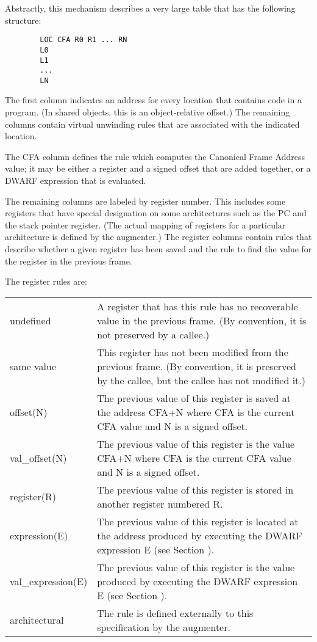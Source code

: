 Abstractly, this mechanism describes a very large table that
has the following structure:

\begin{verbatim}
        LOC CFA R0 R1 ... RN
        L0
        L1
        ...
        LN
\end{verbatim}


The first column indicates an address for every location
that contains code in a program. (In shared objects, this
is an object-relative offset.) The remaining columns contain
virtual unwinding rules that are associated with the indicated
location.

The CFA column defines the rule which computes the Canonical
Frame Address value; it may be either a register and a signed
offset that are added together, or a DWARF expression that
is evaluated.

The remaining columns are labeled by register number. This
includes some registers that have special designation on
some architectures such as the PC and the stack pointer
register. (The actual mapping of registers for a particular
architecture is defined by the augmenter.) The register columns
contain rules that describe whether a given register has been
saved and the rule to find the value for the register in the
previous frame.

The register rules are:

\begin{longtable}{lp{8cm}}
undefined 
&A register that has this rule has no recoverable value in the previous frame.
(By convention, it is not preserved by a callee.) \\

same value
&This register has not been modified from the previous frame. (By convention,
it is preserved by the callee, but the callee has not modified it.) \\

offset(N)
&The previous value of this register is saved at the address CFA+N where CFA
is the current CFA value and N is a signed offset.\\

val\_offset(N)
&The previous value of this register is the value CFA+N where CFA is the
current CFA value and N is a signed offset.\\

register(R)
&The previous value of this register is stored 
in another register numbered R.\\

expression(E)
&The previous value of this register is located at the address produced by
executing the DWARF expression E (see Section {chap:dwarfexpressions}).\\

val\_expression(E) 
&The previous value of this register is the value produced by executing the
DWARF expression E (see Section {chap:dwarfexpressions}).\\

architectural
&The rule is defined externally to this specification by the augmenter.\\

\end{longtable}

